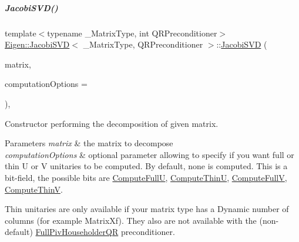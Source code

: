 \mbox{\label{group___s_v_d___module_abfd1dd454a6e3edec7feecd97c818a78}} 
\subparagraph{\texorpdfstring{Jacobi\+S\+V\+D()}{JacobiSVD()}\hspace{0.1cm}{\footnotesize\ttfamily [6/6]}}
{\footnotesize\ttfamily template$<$typename \+\_\+\+Matrix\+Type, int Q\+R\+Preconditioner$>$ \\
\hyperlink{group___s_v_d___module_class_eigen_1_1_jacobi_s_v_d}{Eigen\+::\+Jacobi\+S\+VD}$<$ \+\_\+\+Matrix\+Type, Q\+R\+Preconditioner $>$\+::\hyperlink{group___s_v_d___module_class_eigen_1_1_jacobi_s_v_d}{Jacobi\+S\+VD} (\begin{DoxyParamCaption}\item[{const Matrix\+Type \&}]{matrix,  }\item[{unsigned int}]{computation\+Options = {} }\end{DoxyParamCaption})\hspace{0.3cm}{\ttfamily [inline]}, {\ttfamily [explicit]}}



Constructor performing the decomposition of given matrix. 


\begin{DoxyParams}{Parameters}
{\em matrix} & the matrix to decompose \\
\hline
{\em computation\+Options} & optional parameter allowing to specify if you want full or thin U or V unitaries to be computed. By default, none is computed. This is a bit-\/field, the possible bits are \hyperlink{group__enums_ggae3e239fb70022eb8747994cf5d68b4a9a2b4f91ca5859a4159dbfe8090043817f}{Compute\+FullU}, \hyperlink{group__enums_ggae3e239fb70022eb8747994cf5d68b4a9af8c742a1aa87773e165eae406c9ccaf8}{Compute\+ThinU}, \hyperlink{group__enums_ggae3e239fb70022eb8747994cf5d68b4a9a52c6f7e80bbf9a42297c88f700245b51}{Compute\+FullV}, \hyperlink{group__enums_ggae3e239fb70022eb8747994cf5d68b4a9a1055e53fa95c8ae04a07ebb72cfafd95}{Compute\+ThinV}.\\
\hline
\end{DoxyParams}
Thin unitaries are only available if your matrix type has a Dynamic number of columns (for example Matrix\+Xf). They also are not available with the (non-\/default) \hyperlink{group___q_r___module_class_eigen_1_1_full_piv_householder_q_r}{Full\+Piv\+Householder\+QR} preconditioner. 

